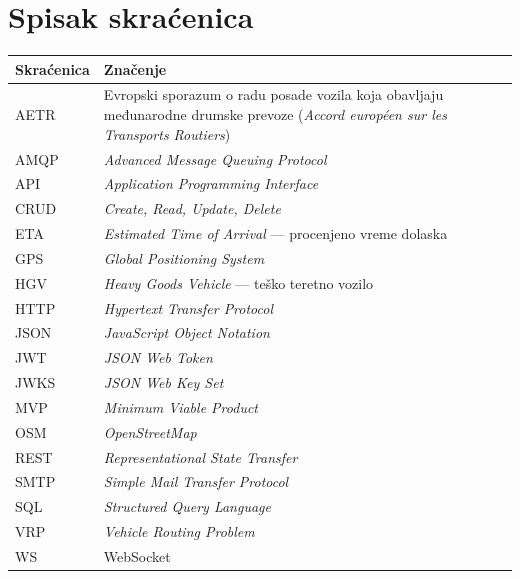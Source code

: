 \chapter*{Spisak skraćenica}
\begin{longtable}{@{}p{}p{}@{}}
\toprule
\textbf{Skraćenica} & \textbf{Značenje} \\
\midrule
\endhead
AETR & Evropski sporazum o radu posade vozila koja obavljaju međunarodne drumske prevoze (\emph{Accord européen sur les Transports Routiers}) \\
AMQP & \emph{Advanced Message Queuing Protocol} \\
API & \emph{Application Programming Interface} \\
CRUD & \emph{Create, Read, Update, Delete} \\
ETA & \emph{Estimated Time of Arrival} --- procenjeno vreme dolaska \\
GPS & \emph{Global Positioning System} \\
HGV & \emph{Heavy Goods Vehicle} --- teško teretno vozilo \\
HTTP & \emph{Hypertext Transfer Protocol} \\
JSON & \emph{JavaScript Object Notation} \\
JWT & \emph{JSON Web Token} \\
JWKS & \emph{JSON Web Key Set} \\
MVP & \emph{Minimum Viable Product} \\
OSM & \emph{OpenStreetMap} \\
REST & \emph{Representational State Transfer} \\
SMTP & \emph{Simple Mail Transfer Protocol} \\
SQL & \emph{Structured Query Language} \\
VRP & \emph{Vehicle Routing Problem} \\
WS & WebSocket \\
\bottomrule
\end{longtable}

\listoffigures

\listoftables

\lstlistoflistings
